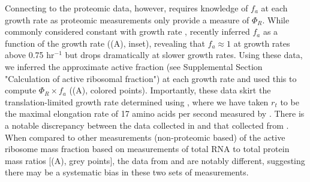 Connecting  to the proteomic data, however, requires knowledge
of $f_a$ at each growth rate as proteomic measurements only provide a measure of
$\Phi_R$. While commonly considered constant with growth rate \citep{klumpp2013,
bosdriesz2015, kostinski2020}, \cite{dai2016} recently inferred $f_a$ as a
function of the growth rate ((A), inset),
revealing that $f_a \approx 1$ at growth rates above 0.75 hr$^{-1}$ but drops
dramatically at slower growth rates. Using these data, we inferred the
approximate active fraction (see Supplemental Section "Calculation of active
ribosomal fraction") at each growth rate and used this to compute $\Phi_R \times
f_a$ ((A), colored points). Importantly,
these data skirt the translation-limited growth rate determined using
, where we have taken $r_t$ to be the maximal elongation rate of
17 amino acids per second measured by \cite{dai2016}. There is a notable
discrepancy between the data collected in \cite{schmidt2016, li2014} and that
collected from \cite{valgepea2013, peebo2015}. When compared to other
measurements (non-proteomic based) of the active ribosome mass fraction based on
measurements of total RNA to total protein mass ratios [(A),
grey points], the data from
\cite{valgepea2013} and \cite{peebo2015} are notably different, suggesting there
may be a systematic bias in these two sets of measurements.


